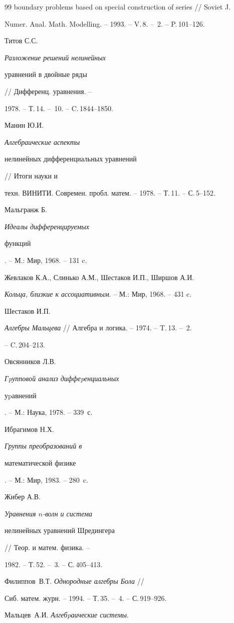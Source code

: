 \begin{thebibliography}{99}
{boundary problems based on special construction of series} // Soviet J.


Numer. Anal. Math. Modelling. -- 1993. -- V.\,8. -- \No\,2. -- P.\,101--126.


 Титов С.С. {\em Разложение решений нелинейных


уравнений в двойные ряды} // Дифференц. уравнения. --


1978. -- Т.\,14. -- \No\,10. -- C.\,1844--1850.


 Манин Ю.И. {\em Алгебраические аспекты


нелинейных дифференциальных уравнений} // Итоги науки и


техн. ВИНИТИ. Современ. пробл. матем. -- 1978. -- Т.\,11. -- С.\,5--152.


 Мальгранж Б. {\em Идеалы дифференцируемых


функций}. -- М.: Мир, 1968. -- 131 c.




Жевлаков К.А., Слинько А.М., Шестаков И.П., Ширшов А.И.


{\em Кольца, близкие к ассоциативным}. -- М.: Мир, 1968. -- 431 c.


 Шестаков И.П.


{\em Алгебры Мальцева} // Алгебра и логика. -- 1974. -- T.\,13. -- \No\,2.


-- C.\,204--213.




Овсянников Л.В. {\em Гpупповой анализ диффеpенциальных


уpавнений}. -- М.: Наука, 1978. -- 339~с.


 Ибрагимов Н.Х. {\em Группы преобразований в


математической физике}. -- М.: Мир, 1983. -- 280~c.


 Жибер А.В. {\em Уравнения $n$-волн и система


нелинейных уравнений Шредингера} // Теор. и матем. физика. --


1982. -- Т.\,52. -- \No\,3. -- С.\,405--413.


 Филиппов~В.Т. {\em Однородные алгебры Бола} //


Сиб. матем. журн. -- 1994. -- Т.\,35. -- \No\,4. -- С.\,919--926.




Мальцев~А.И. {\em Алгебpаические системы}.



\end{thebibliography}
